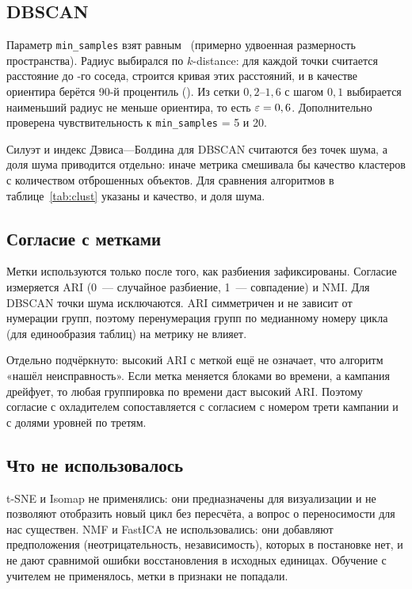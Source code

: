 \documentclass[14pt,a4paper]{extarticle}
\begin{document}
\subsection{DBSCAN}

Параметр \texttt{min\_samples} взят равным \DbMinSamples~(примерно удвоенная
размерность пространства). Радиус выбирался по $k$-distance: для каждой точки
считается расстояние до \DbMinSamples-го соседа, строится кривая этих
расстояний, и в качестве ориентира берётся 90-й процентиль
(\DbEpsRule). Из сетки $0{,}2$--$1{,}6$ с шагом $0{,}1$ выбирается
наименьший радиус не меньше ориентира, то есть $\varepsilon = 0,6$.
Дополнительно проверена чувствительность к \texttt{min\_samples} = 5 и 20.

Силуэт и индекс Дэвиса---Болдина для DBSCAN считаются без точек шума, а доля
шума приводится отдельно: иначе метрика смешивала бы качество кластеров с
количеством отброшенных объектов. Для сравнения алгоритмов в
таблице~\ref{tab:clust} указаны и качество, и доля шума.

\subsection{Согласие с метками}

Метки используются только после того, как разбиения зафиксированы. Согласие
измеряется ARI (0~--- случайное разбиение, 1~--- совпадение) и NMI. Для
DBSCAN точки шума исключаются. ARI симметричен и не зависит от нумерации
групп, поэтому перенумерация групп по медианному номеру цикла (для
единообразия таблиц) на метрику не влияет.

Отдельно подчёркнуто: высокий ARI с меткой ещё не означает, что алгоритм
«нашёл неисправность». Если метка меняется блоками во времени, а кампания
дрейфует, то любая группировка по времени даст высокий ARI. Поэтому
согласие с охладителем сопоставляется с согласием с номером трети кампании и
с долями уровней по третям.

\subsection{Что не использовалось}

t-SNE и Isomap не применялись: они предназначены для визуализации и не
позволяют отобразить новый цикл без пересчёта, а вопрос о переносимости для
нас существен. NMF и FastICA не использовались: они добавляют предположения
(неотрицательность, независимость), которых в постановке нет, и не дают
сравнимой ошибки восстановления в исходных единицах. Обучение с учителем не
применялось, метки в признаки не попадали.
\end{document}
